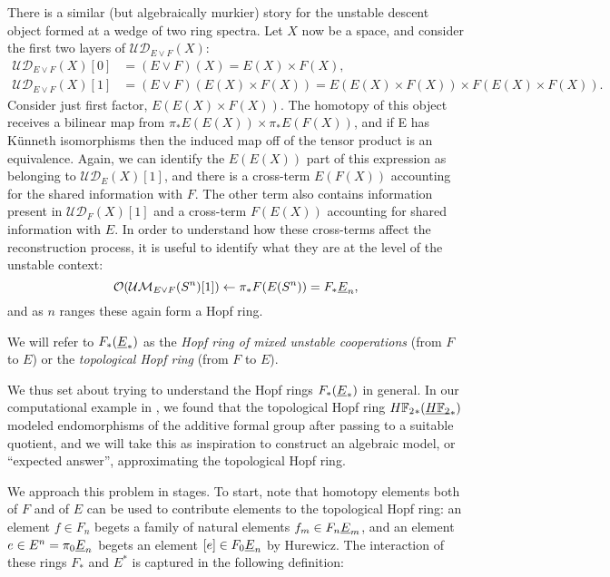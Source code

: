 There is a similar (but algebraically murkier) story for the unstable descent object formed at a wedge of two ring spectra.  Let $X$ now be a space, and consider the first two layers of $\mathcal{UD}_{E \vee F}(X)$:
\begin{align*}
\mathcal{UD}_{E \vee F}(X)[0] & = (E \vee F)(X) = E(X) \times F(X), \\
\mathcal{UD}_{E \vee F}(X)[1] & = (E \vee F)(E(X) \times F(X)) = E(E(X) \times F(X)) \times F(E(X) \times F(X)).
\end{align*}
Consider just first factor, $E(E(X) \times F(X))$.  The homotopy of this object receives a bilinear map from $\pi_* E(E(X)) \times \pi_* E(F(X))$, and if E has K\"unneth isomorphisms then the induced map off of the tensor product is an equivalence.  Again, we can identify the $E(E(X))$ part of this expression as belonging to $\mathcal{UD}_E(X)[1]$, and there is a cross-term $E(F(X))$ accounting for the shared information with $F$.  The other term also contains information present in $\mathcal{UD}_F(X)[1]$ and a cross-term $F(E(X))$ accounting for shared information with $E$.  In order to understand how these cross-terms affect the reconstruction process, it is useful to identify what they are at the level of the unstable context: \[\mathcal{O}(\mathcal{UM}_{E \vee F}(S^n)[1]) \leftarrow \pi_* F(E(S^n)) = F_* \underline{\smash{E}}_{n},\] and as $n$ ranges these again form a Hopf ring.

\begin{definition}
We will refer to $F_*(\underline{\smash{E}}_{*})$ as the \textit{Hopf ring of mixed unstable cooperations} (from $F$ to $E$) or the \textit{topological Hopf ring} (from $F$ to $E$).
\end{definition}

We thus set about trying to understand the Hopf rings $F_*(\underline{\smash{E}}_{*})$ in general.  In our computational example in , we found that the topological Hopf ring $\HFtwo_*(\OS{\HFtwo}{*})$ modeled endomorphisms of the additive formal group after passing to a suitable quotient, and we will take this as inspiration to construct an algebraic model, or ``expected answer'', approximating the topological Hopf ring.

We approach this problem in stages.  To start, note that homotopy elements both of $F$ and of $E$ can be used to contribute elements to the topological Hopf ring: an element $f \in F_n$ begets a family of natural elements $f_m \in F_n \underline{\smash{E}}_{m}$, and an element $e \in E^n = \pi_0 \underline{\smash{E}}_{n}$ begets an element $[e] \in F_0 \underline{\smash{E}}_{n}$ by Hurewicz.  The interaction of these rings $F_*$ and $E^*$ is captured in the following definition:


